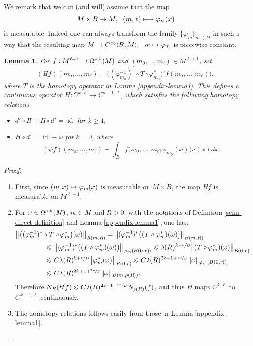 \documentclass[JEP,XML,SOM,Unicode,published]{cedram}
\newcommand{\NoChangel}[1]{%
\expandafter\let\csname old\string#1\endcsname=#1
\let#1=\relax
\newcommand{#1}{\mathcode`l="716C\csname old\string#1\endcsname\mathcode`l="7160 }%
}
\newcommand\mto{\mathchoice{\longmapsto}{\mapsto}{\mapsto}{\mapsto}}
\newcommand{\loc}{\mathrm{loc}}\NoChangel{\loc}
\theoremstyle{plain}
\newtheorem{lemma}[equation]{Lemma}
\theoremstyle{remark}
\theoremstyle{definition}
\DeclareMathOperator{\id}{id}
\begin{document}
We remark that we can (and will) assume that the map
\[ M \times B \to M, ~~(m, x) \mto \varphi_m(x)\]
is measurable.
Indeed one can always transform the family $\{\varphi_m\}_{m \in M}$ in such a way that the resulting map
$M \to C^\infty (B, M), ~~ m \mto \varphi_m$
is piecewise constant.
\begin{lemma}\label{appendix-lemma1bis}
For $f: M^{\ell +1} \to \Omega^{p,k}_{\loc}(M)$ and $(m_0, \dots, m_\ell) \in M^{\ell +1}$,
set
\[(Hf)(m_0, \dots, m_\ell) =
\bigl((\varphi_{m_0}^{-1})^* \circ T \circ \varphi_{m_0}^* \bigr)\bigl(f(m_0, \dots, m_\ell)\bigr),\]
where $T$ is the homotopy operator in Lemma \ref{appendix-lemma1}.
This defines a continuous operator $H: C^{k,\ell} \to C^{k-1,\ell}$, which satisfies the following homotopy
relations
\begin{itemize}
\item $d' \circ H + H \circ d' = \id$ for $k \geqslant 1$,
\item $H \circ d' = \id - \psi$ for $k=0$, where
\[(\psi f)(m_0, \dots, m_\ell) = \int_B f\bigl(m_0, \dots, m_\ell; \varphi_{m_0}(x)\bigr)h(x)dx.\]
\end{itemize}
\end{lemma}

\skpt
\begin{proof}
\begin{enumerate}
\item
First, since $(m, x) \mto \varphi_m(x)$ is measurable on $M \times B$, the map $Hf$ is measurable on $M^{\ell +1}$.

\item
For $\omega \in \Omega^{p,k}_{\loc}(M)$, $m \in M$ and $R>0$, with the notations of
Definition \ref{semi-direct-definition} and Lemma \ref{appendix-lemma1}, one has:
\begin{align*}
\bigl\Vert \bigl((\varphi_{m}^{-1})^* \circ T &\circ \varphi_{m}^* \bigr) (\omega)\bigr\Vert_{B(m,R)}
= \bigl\Vert (\varphi_{m}^{-1})^* \bigl((T \circ \varphi_{m}^*)(\omega)\bigr) \bigr\Vert_{B(m,R)}\\
\leqslant~ & \bigl\Vert (\varphi_{m}^{-1})^* \bigl((T \circ \varphi_{m}^*)(\omega)\bigr) \bigr\Vert_{\varphi_m (B(0,r))}
\leqslant \lambda(R)^{k+\sfrac{p}{D}} \bigl\Vert (T \circ \varphi_{m}^*)(\omega) \bigr\Vert_{B(0,r)} \\
\leqslant~ & C \lambda(R)^{k+\sfrac{p}{D}} \bigl\Vert \varphi_{m}^* (\omega) \bigr\Vert_{B(0,r)}
\leqslant C \lambda(R)^{2k+1+\sfrac{2p}{D}} \Vert \omega \Vert_{\varphi_m (B(0,r))} \\
\leqslant~ & C \lambda(R)^{2k+1+\sfrac{2p}{D}} \Vert \omega \Vert_{B(m, \rho(R))}.
\end{align*}
Therefore
$N_R(Hf) \leqslant C \lambda(R)^{2k+1+\sfrac{2p}{D}} N_{\rho(R)}(f)$, and thus $H$ maps $C^{k,\ell}$ to $C^{k-1,\ell}$ continuously.

\item
The homotopy relations follows easily from those in Lemma \ref{appendix-lemma1}.\qedhere
\end{enumerate}
\end{proof}
\end{document}
